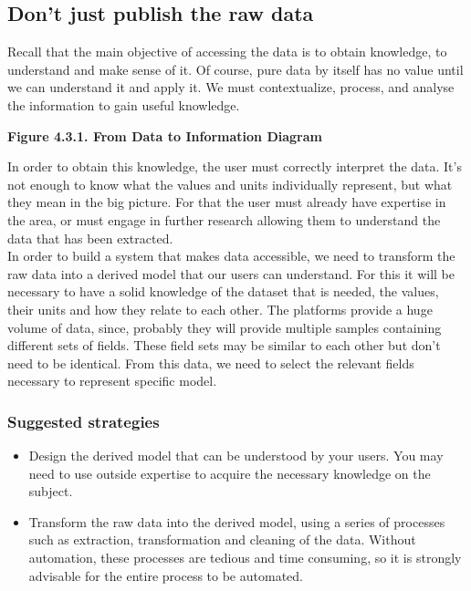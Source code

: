 \subsection{Don't just publish the raw data}

Recall that the main objective of accessing the data is to obtain knowledge, to understand and make sense of it.
Of course, pure data by itself has no value until we can understand it and apply it.
We must contextualize, process, and analyse the information to gain useful knowledge. \\ 
    
\begin{center}
    \bf{        
    Figure 4.3.1. From Data to Information Diagram}
\end{center}
 
In order to obtain this knowledge, the user must correctly interpret the data.
It's not enough to know what the values and units individually represent, but what they mean in the big picture.
For that the user must already have expertise in the area, or must engage in further research allowing them to understand the data that has been extracted.\\
    
In order to build a system that makes data accessible, we need to transform the raw data into a derived model that our users can understand.
For this it will be necessary to have a solid knowledge of the dataset that is needed, the values, their units and how they relate to each other.
The platforms provide a huge volume of data, since, probably they will provide multiple samples containing different sets of fields. 
These field sets may be similar to each other but don't need to be identical.
From this data, we need to select the relevant fields necessary to represent specific model.\\

\subsubsection*{Suggested strategies} 

\begin{itemize}
    \item Design the derived model that can be understood by your users. You may need to use outside expertise to acquire the necessary knowledge on the subject.

    \item Transform the raw data into the derived model, using a series of processes such as extraction, transformation and cleaning of the data.
        Without automation, these processes are tedious and time consuming, so it is strongly advisable for the entire process to be automated.
\end{itemize}

